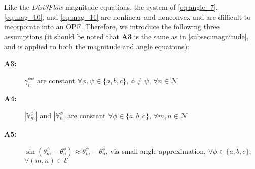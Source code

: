 Like the \emph{Dist3Flow} magnitude equations, the system of \eqref{eq:angle_7}, \eqref{eq:mag_10}, and \eqref{eq:mag_11} are nonlinear and nonconvex and are difficult to incorporate into an OPF. Therefore, we introduce the following three assumptions (it should be noted that \textbf{A3} is the same as in \ref{subsec:magnitude}, and is applied to both the magnitude and angle equations):
\begin{description}
	\item[\textbf{A3:} ] $\gamma_{n}^{\phi \psi}$ are constant $\forall \phi, \psi \in \{a,b,c\}$, $\phi \ne \psi$, $\forall n \in \mathcal{N}$
    \item[\textbf{A4:} ] $\left| \mathbb{V}_{m}^{\phi} \right|$ and $\left| \mathbb{V}_{n}^{\phi} \right|$ are constant $\forall \phi \in \{a,b,c\}$, $\forall m , n \in \mathcal{N}$
    \item[\textbf{A5:} ] $\sin \left( \theta_{m}^{\phi} - \theta_{n}^{\phi} \right) \approx \theta_{m}^{\phi} - \theta_{n}^{\phi}$, via small angle approximation, $\forall \phi \in \{a,b,c\}$, $\forall (m,n) \in \mathcal{E}$
\end{description}


